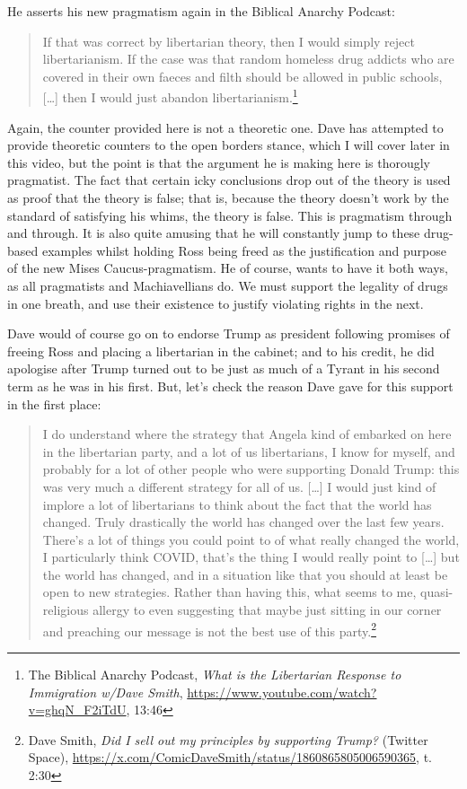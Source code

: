 \documentclass[11pt]{article}
\begin{document}
He asserts his new pragmatism again in the Biblical Anarchy Podcast:
\begin{quote}
If that was correct by libertarian theory, then I would simply reject libertarianism. If the case was that random homeless drug addicts who are covered in their own faeces and filth should be allowed in public schools, [\ldots{}] then I would just abandon libertarianism.\footnote{The Biblical Anarchy Podcast, \emph{What is the Libertarian Response to Immigration w/Dave Smith}, \url{https://www.youtube.com/watch?v=ghqN\_F2iTdU}, 13:46}
\end{quote}

Again, the counter provided here is not a theoretic one. Dave has attempted to provide theoretic counters to the open borders stance, which I will cover later in this video, but the point is that the argument he is making here is thorougly pragmatist. The fact that certain icky conclusions drop out of the theory is used as proof that the theory is false; that is, because the theory doesn't work by the standard of satisfying his whims, the theory is false. This is pragmatism through and through. It is also quite amusing that he will constantly jump to these drug-based examples whilst holding Ross being freed as the justification and purpose of the new Mises Caucus-pragmatism. He of course, wants to have it both ways, as all pragmatists and Machiavellians do. We must support the legality of drugs in one breath, and use their existence to justify violating rights in the next.

Dave would of course go on to endorse Trump as president following promises of freeing Ross and placing a libertarian in the cabinet; and to his credit, he did apologise after Trump turned out to be just as much of a Tyrant in his second term as he was in his first. But, let's check the reason Dave gave for this support in the first place:
\begin{quote}
I do understand where the strategy that Angela kind of embarked on here in the libertarian party, and a lot of us libertarians, I know for myself, and probably for a lot of other people who were supporting Donald Trump: this was very much a different strategy for all of us. [\ldots{}] I would just kind of implore a lot of libertarians to think about the fact that the world has changed. Truly drastically the world has changed over the last few years. There's a lot of things you could point to of what really changed the world, I particularly think COVID, that's the thing I would really point to [\ldots{}] but the world has changed, and in a situation like that you should at least be open to new strategies. Rather than having this, what seems to me, quasi-religious allergy to even suggesting that maybe just sitting in our corner and preaching our message is not the best use of this party.\footnote{Dave Smith, \emph{Did I sell out my principles by supporting Trump?} (Twitter Space), \url{https://x.com/ComicDaveSmith/status/1860865805006590365}, t. 2:30}
\end{quote}
\end{document}
